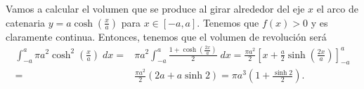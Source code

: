 \begin{eg}
	\normalfont Vamos a calcular el volumen que se produce al girar alrededor del eje $\displaystyle x $ el arco de catenaria $\displaystyle y = a \cosh\left(\frac{x}{a}\right) $ para $\displaystyle x \in [- a, a] $. Tenemos que $\displaystyle f\left(x\right) > 0 $ y es claramente continua. 	Entonces, tenemos que el volumen de revolución será
\[
\begin{split}
	\int^{a}_{-a} \pi a^{2}\cosh^{2}\left(\frac{x}{a}\right) \; dx = & \pi a^{2}\int^{a}_{-a} \frac{1 + \cosh\left(\frac{2x}{a}\right)}{2} \; dx = \frac{\pi a^{2}}{2}\left[x + \frac{a}{2}\sinh\left(\frac{2x}{a}\right)\right] ^{a}_{-a} \\
	= & \frac{\pi a^{2}}{2}\left(2a + a\sinh2\right) = \pi a^{3}\left(1 + \frac{\sinh 2}{2}\right).
\end{split}
\]
\end{eg}
